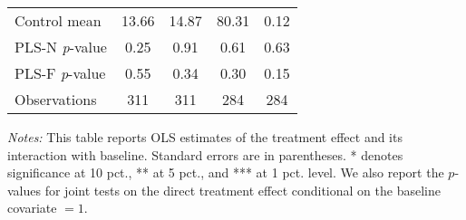 \begin{table}[ht]
{\begin{threeparttable}
\begin{tabular}{l*{4}{c}}
Control mean    &    13.66         &    14.87         &    80.31         &     0.12         \\
PLS-N \emph{p}-value&     0.25         &     0.91         &     0.61         &     0.63         \\
PLS-F \emph{p}-value&     0.55         &     0.34         &     0.30         &     0.15         \\
Observations    &      311         &      311         &      284         &      284         \\
\bottomrule \end{tabular} \begin{tablenotes}[flushleft] \footnotesize \item \emph{Notes:} This table reports OLS estimates of the treatment effect and its interaction with baseline. Standard errors are in parentheses. * denotes significance at 10 pct., ** at 5 pct., and *** at 1 pct. level. We also report the \(p\)-values for joint tests on the direct treatment effect conditional on the baseline covariate $= 1$. \end{tablenotes} \end{threeparttable} } \end{table}

